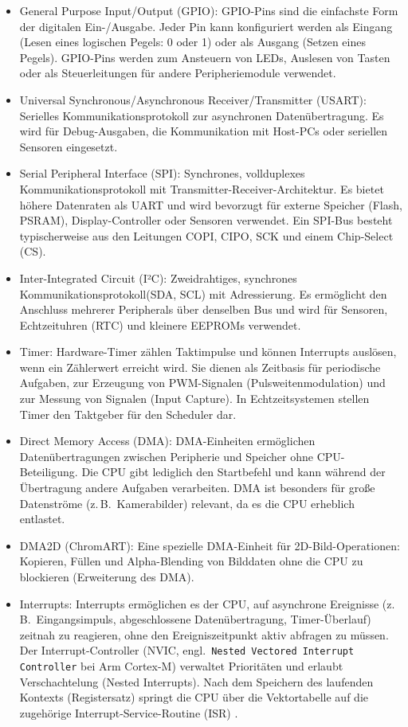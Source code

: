 \begin{itemize}
    \item General Purpose Input/Output (GPIO): GPIO-Pins sind die einfachste Form der digitalen Ein-/Ausgabe. Jeder Pin kann konfiguriert werden als Eingang (Lesen eines logischen Pegels: 0 oder 1) oder als Ausgang (Setzen eines Pegels). GPIO-Pins werden zum Ansteuern von LEDs, Auslesen von Tasten oder als Steuerleitungen für andere Peripheriemodule verwendet.
    \item  Universal Synchronous/Asynchronous Receiver/Transmitter (USART):  Serielles Kommunikationsprotokoll zur asynchronen Datenübertragung. Es wird für Debug-Ausgaben, die Kommunikation mit Host-PCs oder seriellen Sensoren eingesetzt.
    \item Serial Peripheral Interface (SPI): Synchrones, vollduplexes Kommunikationsprotokoll mit Transmitter-Receiver-Architektur. Es bietet höhere Datenraten als UART und wird bevorzugt für externe Speicher (Flash, PSRAM), Display-Controller oder Sensoren verwendet. Ein SPI-Bus besteht typischerweise aus den Leitungen COPI, CIPO, SCK und einem Chip-Select (CS).
    \item Inter-Integrated Circuit (I²C):  Zweidrahtiges, synchrones Kommunikationsprotokoll\linebreak (SDA, SCL) mit Adressierung. Es ermöglicht den Anschluss mehrerer Peripherals über denselben Bus und wird für Sensoren, Echtzeituhren (RTC) und kleinere EEPROMs verwendet.
    \item Timer: 
    Hardware-Timer zählen Taktimpulse und können Interrupts auslösen, wenn ein Zählerwert erreicht wird. Sie dienen als Zeitbasis für periodische Aufgaben, zur Erzeugung von PWM-Signalen (Pulsweitenmodulation) und zur Messung von Signalen (Input Capture). In Echtzeitsystemen stellen Timer den Taktgeber für den Scheduler dar.
    \item Direct Memory Access (DMA): DMA-Einheiten ermöglichen Datenübertragungen zwischen Peripherie und Speicher ohne CPU-Beteiligung. Die CPU gibt lediglich den Startbefehl und kann während der Übertragung andere Aufgaben verarbeiten. DMA ist besonders für große Datenströme (z.\,B.\ Kamerabilder) relevant, da es die CPU erheblich entlastet.
    \item DMA2D (ChromART):  Eine spezielle DMA-Einheit für 2D-Bild-Operationen: Kopieren, Füllen und Alpha-Blending von Bilddaten ohne die CPU zu blockieren (Erweiterung des DMA).
    \item Interrupts:  Interrupts ermöglichen es der CPU, auf asynchrone Ereignisse (z.\,B.\ Eingangsimpuls, abgeschlossene Datenübertragung, Timer-Überlauf) zeitnah zu reagieren, ohne den Ereigniszeitpunkt aktiv abfragen zu müssen. Der Interrupt-Controller (NVIC, engl.\ \texttt{Nested Vectored Interrupt Controller} bei Arm Cortex-M) verwaltet Prioritäten und erlaubt Verschachtelung (Nested Interrupts). Nach dem Speichern des laufenden Kontexts (Registersatz) springt die CPU über die Vektortabelle auf die zugehörige Interrupt-Service-Routine (ISR) \cite[S. 104 ff.]{yiuDefinitiveGuideARM2013}.

\end{itemize}
